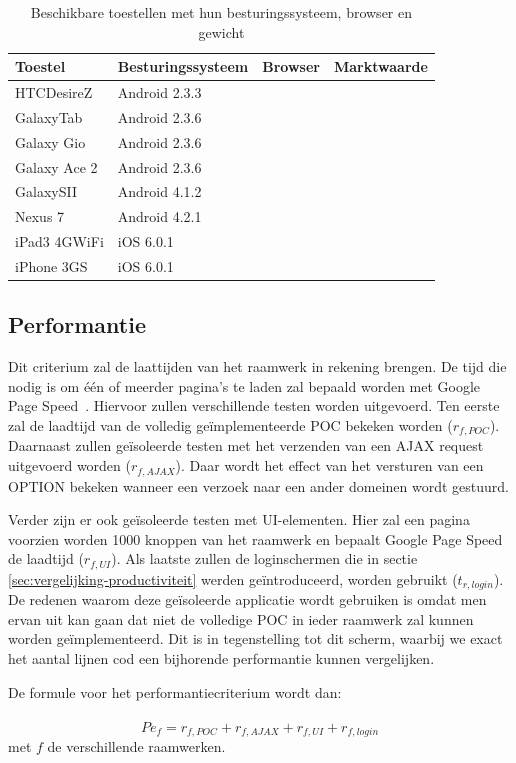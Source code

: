 \begin{table}[h]
  \centering
  \begin{tabular}{llll}
    \toprule
    \textbf{Toestel} & \textbf{Besturingssysteem} & \textbf{Browser} & \textbf{Marktwaarde}\\
    \midrule
    HTCDesireZ & Android 2.3.3 &  & \\
    GalaxyTab & Android 2.3.6 &  & \\
    Galaxy Gio & Android 2.3.6 &  & \\
    Galaxy Ace 2 & Android 2.3.6 &  & \\
    GalaxySII & Android 4.1.2 &  & \\
    Nexus 7 & Android 4.2.1  &  & \\
    iPad3 4GWiFi & iOS 6.0.1 &  & \\
    iPhone 3GS & iOS 6.0.1 &  & \\
    \bottomrule
  \end{tabular}
  \caption{Beschikbare toestellen met hun besturingssysteem, browser en gewicht}
  \label{tabel:toestellen-hci}
\end{table}

\subsection{Performantie}
\label{sec:vergelijking-performantie}
Dit criterium zal de laattijden van het raamwerk in rekening brengen.
De tijd die nodig is om één of meerder pagina's te laden zal bepaald worden met Google Page Speed~\cite{Morgan2011}. 
Hiervoor zullen verschillende testen worden uitgevoerd. 
Ten eerste zal de laadtijd van de volledig geïmplementeerde POC bekeken worden ($r_{f,POC}$). 
Daarnaast zullen geïsoleerde testen met het verzenden van een AJAX request uitgevoerd worden ($r_{f,AJAX}$).
Daar wordt het effect van het versturen van een OPTION  bekeken wanneer een verzoek naar een ander domeinen wordt gestuurd.

Verder zijn er ook geïsoleerde testen met UI-elementen. 
Hier zal een  pagina voorzien worden 1000 knoppen van het raamwerk en bepaalt Google Page Speed de laadtijd ($r_{f,UI}$). 
Als laatste zullen de loginschermen die in sectie \ref{sec:vergelijking-productiviteit} werden geïntroduceerd, worden gebruikt ($t_{r,login}$). 
De redenen waarom deze geïsoleerde applicatie wordt gebruiken is omdat men ervan uit kan gaan dat niet de volledige POC in ieder raamwerk zal kunnen worden geïmplementeerd. 
Dit is in tegenstelling tot dit scherm, waarbij we exact het aantal lijnen cod een bijhorende performantie kunnen vergelijken.

De formule voor het performantiecriterium wordt dan: 
\paragraph{}
\begin{equation}
  Pe_f=r_{f,POC}+r_{f,AJAX}+r_{f,UI}+r_{f,login} 
  \label{eq:performantie}
\end{equation}
met $f$ de verschillende raamwerken.

